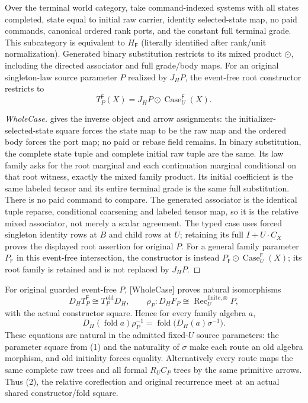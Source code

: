 \documentclass[11pt]{article}
\begin{document}
\begin{lemma}
Over the terminal world category, take command-indexed systems with all states completed, state equal to initial raw carrier, identity selected-state map, no paid commands, canonical ordered rank ports, and the constant full terminal grade. This subcategory is equivalent to $H_{\mathsf F}$ (literally identified after rank/unit normalization). Generated binary substitution restricts to its mixed product $\odot$, including the directed associator and full grade/body maps. For an original singleton-law source parameter $P$ realized by $J_HP$, the event-free root constructor restricts to
\[
 T_P^{\mathsf F}(X)=J_HP\odot\operatorname{Case}_U^{\mathsf F}(X).
\]
\end{lemma}
\begin{proof}
[WholeCase] gives the inverse object and arrow assignments: the initializer-selected-state square forces the state map to be the raw map and the ordered body forces the port map; no paid or rebase field remains. In binary substitution, the complete state tuple and complete initial raw tuple are the same. Its law family asks for the root marginal and each continuation marginal conditional on that root witness, exactly the mixed family product. Its initial coefficient is the same labeled tensor and its entire terminal grade is the same full substitution. There is no paid command to compare. The generated associator is the identical tuple reparse, conditional coarsening and labeled tensor map, so it is the relative mixed associator, not merely a scalar agreement. The typed case uses forced singleton identity rows at $B$ and child rows at $U$; retaining its full $I+U\cdot C_X$ proves the displayed root assertion for original $P$. For a general family parameter $P_{\mathsf F}$ in this event-free intersection, the constructor is instead $P_{\mathsf F}\odot\operatorname{Case}_U^{\mathsf F}(X)$; its root family is retained and is not replaced by $J_HP$.
\end{proof}

For original guarded event-free $P$, [WholeCase] proves natural isomorphisms
\[
 D_HT_P^{\mathsf F}\cong T_P^{\mathrm{old}}D_H,\qquad
 \rho_P:D_HF_P\cong\operatorname{Rec}^{\mathrm{finite},\otimes}_UP,       \tag{3}
\]
with the actual constructor square. Hence for every family algebra $a$,
\[
 D_H(\operatorname{fold}a)\rho_P^{-1}
   =\operatorname{fold}\bigl(D_H(a)\sigma^{-1}\bigr).                 \tag{4}
\]
These equations are natural in the admitted fixed-$U$ source parameters: the parameter square from (1) and the naturality of $\sigma$ make each route an old algebra morphism, and old initiality forces equality. Alternatively every route maps the same complete raw trees and all formal $R_UC_P$ trees by the same primitive arrows. Thus (2), the relative coreflection and original recurrence meet at an actual shared constructor/fold square.
\end{document}
